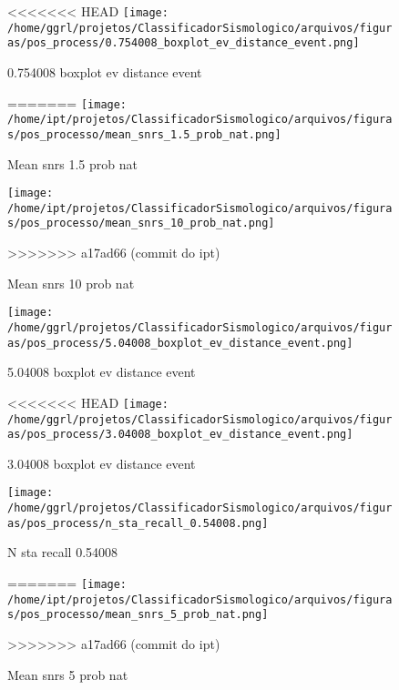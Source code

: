                     \begin{figure}[H]
                        \centering
<<<<<<< HEAD
                        \texttt{[image: /home/ggrl/projetos/ClassificadorSismologico/arquivos/figuras/pos\_process/0.754008\_boxplot\_ev\_distance\_event.png]}
                        \caption{0.754008 boxplot ev distance event}
                        \label{fig:0.754008_boxplot_ev_distance_event}
=======
                        \texttt{[image: /home/ipt/projetos/ClassificadorSismologico/arquivos/figuras/pos\_processo/mean\_snrs\_1.5\_prob\_nat.png]}
                        \caption{Mean snrs 1.5 prob nat}
                        \label{fig:mean_snrs_1.5_prob_nat}
                    \end{figure}
                

                    \begin{figure}[H]
                        \centering
                        \texttt{[image: /home/ipt/projetos/ClassificadorSismologico/arquivos/figuras/pos\_processo/mean\_snrs\_10\_prob\_nat.png]}
                        \caption{Mean snrs 10 prob nat}
                        \label{fig:mean_snrs_10_prob_nat}
>>>>>>> a17ad66 (commit do ipt)
                    \end{figure}
                

                    \begin{figure}[H]
                        \centering
                        \texttt{[image: /home/ggrl/projetos/ClassificadorSismologico/arquivos/figuras/pos\_process/5.04008\_boxplot\_ev\_distance\_event.png]}
                        \caption{5.04008 boxplot ev distance event}
                        \label{fig:5.04008_boxplot_ev_distance_event}
                    \end{figure}
                

                    \begin{figure}[H]
                        \centering
<<<<<<< HEAD
                        \texttt{[image: /home/ggrl/projetos/ClassificadorSismologico/arquivos/figuras/pos\_process/3.04008\_boxplot\_ev\_distance\_event.png]}
                        \caption{3.04008 boxplot ev distance event}
                        \label{fig:3.04008_boxplot_ev_distance_event}
                    \end{figure}
                

                    \begin{figure}[H]
                        \centering
                        \texttt{[image: /home/ggrl/projetos/ClassificadorSismologico/arquivos/figuras/pos\_process/n\_sta\_recall\_0.54008.png]}
                        \caption{N sta recall 0.54008}
                        \label{fig:n_sta_recall_0.54008}
=======
                        \texttt{[image: /home/ipt/projetos/ClassificadorSismologico/arquivos/figuras/pos\_processo/mean\_snrs\_5\_prob\_nat.png]}
                        \caption{Mean snrs 5 prob nat}
                        \label{fig:mean_snrs_5_prob_nat}
>>>>>>> a17ad66 (commit do ipt)
                    \end{figure}
                

